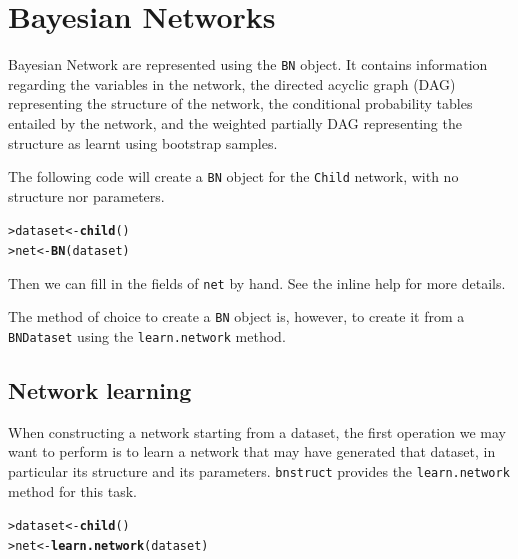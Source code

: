 \documentclass{article}\usepackage[]{graphicx}\usepackage[]{color}
\makeatletter
\newcommand{\hlstd}[1]{\textcolor[rgb]{0.345,0.345,0.345}{#1}}%
\newcommand{\hlkwb}[1]{\textcolor[rgb]{0.69,0.353,0.396}{#1}}%
\newcommand{\hlkwd}[1]{\textcolor[rgb]{0.737,0.353,0.396}{\textbf{#1}}}%
\newenvironment{kframe}{%
 \def\at@end@of@kframe{}%
 \ifinner\ifhmode%
  \def\at@end@of@kframe{\end{minipage}}%
  \begin{minipage}{\columnwidth}%
 \fi\fi%
 \def\FrameCommand##1{\hskip\@totalleftmargin \hskip-\fboxsep
 \colorbox{shadecolor}{##1}\hskip-\fboxsep
     \hskip-\linewidth \hskip-\@totalleftmargin \hskip\columnwidth}%
 \MakeFramed {\advance\hsize-\width
   \@totalleftmargin\z@ \linewidth\hsize
   \@setminipage}}%
 {\par\unskip\endMakeFramed%
 \at@end@of@kframe}
\newenvironment{knitrout}{}{} %
\newcommand{\Robject}[1]{{\texttt{#1}}}
\newcommand{\Rpackage}[1]{{\texttt{#1}}}
\newcommand{\Rmethod}[1]{{\texttt{#1}}}
\makeatother
\begin{document}
\section{Bayesian Networks}
Bayesian Network are represented using the \Robject{BN} object. It contains information regarding the variables in the network,
the directed acyclic graph (DAG) representing the structure of the network, the conditional probability tables entailed by 
the network, and the weighted partially DAG representing the structure as learnt using bootstrap samples.

The following code will create a \Robject{BN} object for the \texttt{Child} network, with no structure nor parameters.
\begin{knitrout}
\color{fgcolor}\begin{kframe}
\begin{alltt}
\hlstd{> }\hlstd{dataset} \hlkwb{<-} \hlkwd{child}\hlstd{()}
\hlstd{> }\hlstd{net}     \hlkwb{<-} \hlkwd{BN}\hlstd{(dataset)}
\end{alltt}
\end{kframe}
\end{knitrout}
Then we can fill in the fields of \Rmethod{net} by hand. See the inline help for more details.

The method of choice to create a \Robject{BN} object is, however, to create it from a \Robject{BNDataset} using the
\Rmethod{learn.network} method.

\subsection{Network learning}\label{sec:networklearning}
When constructing a network starting from a dataset, the first operation we may want to perform is to learn
a network that may have generated that dataset, in particular its structure and its parameters.
\Rpackage{bnstruct} provides the \Rmethod{learn.network} method for this task.
\begin{knitrout}
\color{fgcolor}\begin{kframe}
\begin{alltt}
\hlstd{> }\hlstd{dataset} \hlkwb{<-} \hlkwd{child}\hlstd{()}
\hlstd{> }\hlstd{net}     \hlkwb{<-} \hlkwd{learn.network}\hlstd{(dataset)}
\end{alltt}
\end{kframe}
\end{knitrout}
\end{document}
